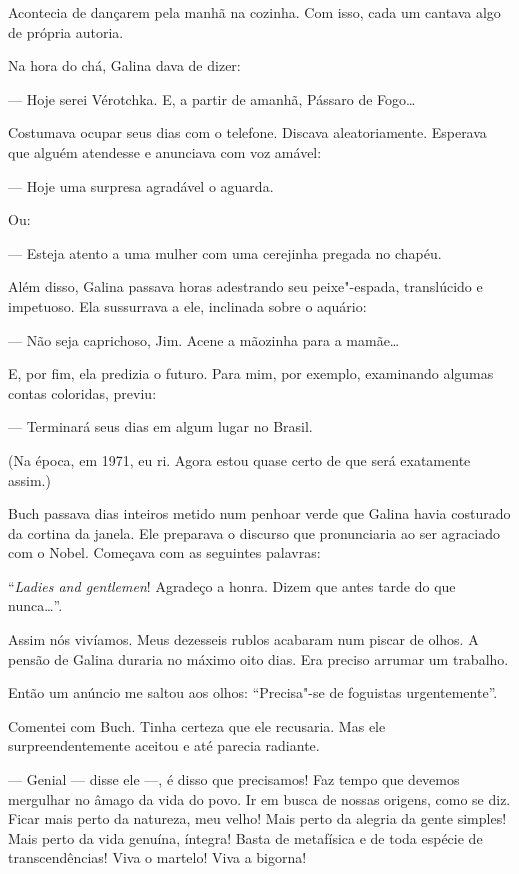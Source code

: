 Acontecia de dançarem pela manhã na cozinha. Com isso, cada um cantava
algo de própria autoria.

Na hora do chá, Galina dava de dizer:

--- Hoje serei Vérotchka. E, a partir de amanhã, Pássaro de Fogo\ldots{}

Costumava ocupar seus dias com o telefone. Discava aleatoriamente.
Esperava que alguém atendesse e anunciava com voz amável:

--- Hoje uma surpresa agradável o aguarda.

Ou:

--- Esteja atento a uma mulher com uma cerejinha pregada no chapéu.

Além disso, Galina passava horas adestrando seu peixe"-espada,
translúcido e impetuoso. Ela sussurrava a ele, inclinada sobre o
aquário:

--- Não seja caprichoso, Jim. Acene a mãozinha para a mamãe\ldots{}

E, por fim, ela predizia o futuro. Para mim, por exemplo, examinando
algumas contas coloridas, previu:

--- Terminará seus dias em algum lugar no Brasil.

(Na época, em 1971, eu ri. Agora estou quase certo de que será
exatamente assim.)

Buch passava dias inteiros metido num penhoar verde que Galina havia
costurado da cortina da janela. Ele preparava o discurso que
pronunciaria ao ser agraciado com o Nobel. Começava com as seguintes
palavras:

``\emph{Ladies and gentlemen}! Agradeço a honra. Dizem que antes tarde
do que nunca\ldots{}''.

Assim nós vivíamos. Meus dezesseis rublos acabaram num piscar de olhos.
A pensão de Galina duraria no máximo oito dias. Era preciso arrumar um
trabalho.

Então um anúncio me saltou aos olhos: ``Precisa"-se de foguistas
urgentemente''.

Comentei com Buch. Tinha certeza que ele recusaria. Mas ele
surpreendentemente aceitou e até parecia radiante.

--- Genial --- disse ele ---, é disso que precisamos! Faz tempo que
devemos mergulhar no âmago da vida do povo. Ir em busca de nossas
origens, como se diz. Ficar mais perto da natureza, meu velho! Mais
perto da alegria da gente simples! Mais perto da vida genuína, íntegra! Basta de metafísica e de toda espécie
de transcendências! Viva o martelo! Viva a bigorna!

